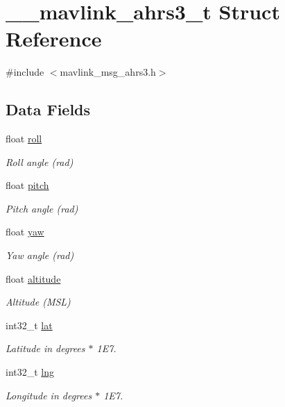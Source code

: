 \hypertarget{struct____mavlink__ahrs3__t}{\section{\+\_\+\+\_\+mavlink\+\_\+ahrs3\+\_\+t Struct Reference}
\label{struct____mavlink__ahrs3__t}
}


{\ttfamily \#include $<$mavlink\+\_\+msg\+\_\+ahrs3.\+h$>$}

\subsection*{Data Fields}
\begin{DoxyCompactItemize}
\item 
float \hyperlink{struct____mavlink__ahrs3__t_ad54d74528fa2a52bd8aeaa1a17a8eb30}{roll}
\begin{DoxyCompactList}\small\item\em Roll angle (rad) \end{DoxyCompactList}\item 
float \hyperlink{struct____mavlink__ahrs3__t_a24195c2ab85c487133f52fca56fff7b2}{pitch}
\begin{DoxyCompactList}\small\item\em Pitch angle (rad) \end{DoxyCompactList}\item 
float \hyperlink{struct____mavlink__ahrs3__t_a114b9b517acb3aca56651c508b8d4a1c}{yaw}
\begin{DoxyCompactList}\small\item\em Yaw angle (rad) \end{DoxyCompactList}\item 
float \hyperlink{struct____mavlink__ahrs3__t_af0c11044e608b509b9d84adcc93b146b}{altitude}
\begin{DoxyCompactList}\small\item\em Altitude (M\+S\+L) \end{DoxyCompactList}\item 
int32\+\_\+t \hyperlink{struct____mavlink__ahrs3__t_a0ca3576a6aae648a8c33b670ed32f3be}{lat}
\begin{DoxyCompactList}\small\item\em Latitude in degrees $\ast$ 1\+E7. \end{DoxyCompactList}\item 
int32\+\_\+t \hyperlink{struct____mavlink__ahrs3__t_aa840cc075de9dc3056cd5b3712318143}{lng}
\begin{DoxyCompactList}\small\item\em Longitude in degrees $\ast$ 1\+E7. \end{DoxyCompactList}\item 

\end{DoxyCompactItemize}
